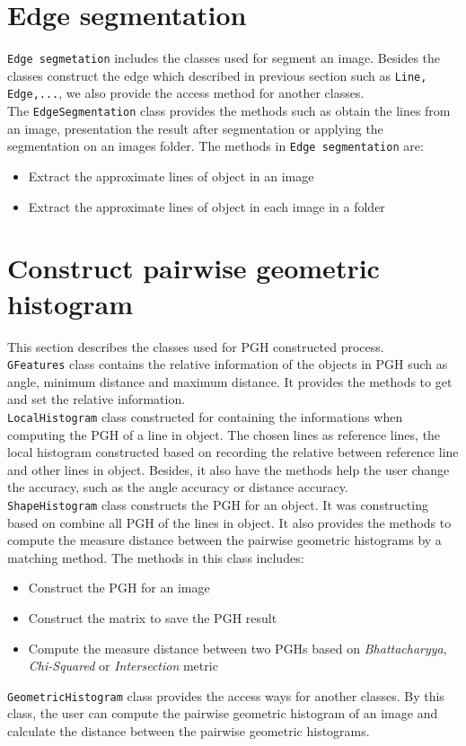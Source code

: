 \section{Edge segmentation }
\texttt{Edge segmetation} includes the classes used for segment an image. Besides the classes construct the edge which described in previous section such as \texttt{Line, Edge,...}, we also provide the access method for another classes.\\[0.2cm]
The \texttt{EdgeSegmentation} class provides the methods such as obtain the lines from an image, presentation the result after segmentation or applying the segmentation on an images folder. The methods in \texttt{Edge segmentation} are:
\begin{itemize}
\item Extract the approximate lines of object in an image
\item Extract the approximate lines of object in each image in a folder
\end{itemize}
\section{Construct pairwise geometric histogram}
This section describes the classes used for PGH constructed process.\\[0.2cm]
\texttt{GFeatures} class contains the relative information of the objects in PGH such as angle, minimum distance and maximum distance. It provides the methods to get and set the relative information.\\[0.2cm]
\texttt{LocalHistogram} class constructed for containing the informations when computing the PGH of a line in object. The chosen lines as reference lines, the local histogram constructed based on recording the relative between reference line and other lines in object. Besides, it also have the methods help the user change the accuracy, such as the angle accuracy or distance accuracy.\\[0.2cm]
\texttt{ShapeHistogram} class constructs the PGH for an object. It was constructing based on combine all PGH of the lines in object. It also provides the methods to compute the measure distance between the pairwise geometric histograms by a matching method. The methods in this class includes:
\begin{itemize}
\item Construct the PGH for an image
\item Construct the matrix to save the PGH result
\item Compute the measure distance between two PGHs based on \textit{Bhattacharyya}, \textit{Chi-Squared} or \textit{Intersection} metric
\end{itemize}
\texttt{GeometricHistogram} class provides the access ways for another classes. By this class, the user can compute the pairwise geometric histogram of an image and calculate the distance between the pairwise geometric histograms.

